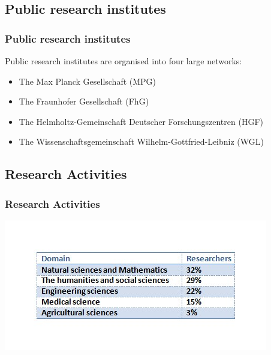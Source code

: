 \documentclass[9pt, compress]{beamer}
\begin{document}
	\subsection{Public research institutes}
	\begin{frame} 
		\frametitle{Public research institutes}
		
			Public research institutes are  organised into four large networks:
			\begin{itemize}
			\item The Max Planck Gesellschaft (MPG) 
            \item The Fraunhofer Gesellschaft (FhG)
            \item The Helmholtz-Gemeinschaft Deutscher Forschungszentren (HGF) 
            \item The Wissenschaftsgemeinschaft Wilhelm-Gottfried-Leibniz (WGL)
		\end{itemize}
	\end{frame}
	\subsection{Research Activities}
	\begin{frame} 
			\frametitle{Research Activities}
		
			\centering
		\includegraphics[scale=0.7]{img/Domain_Res.jpg}
	\end{frame}
\end{document}
